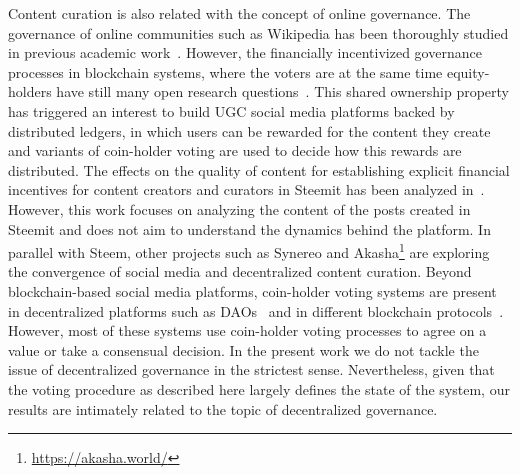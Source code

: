   Content curation is also related with the concept of online governance. The governance of online communities such as Wikipedia has been thoroughly studied in previous academic work~\cite{leskovec2010governance,forte2008scaling}. However, the financially incentivized governance processes in blockchain systems, where the voters are at the same time equity-holders have still many open research questions~\cite{vitalik,ehrsam}. This shared ownership property has triggered an interest to build UGC social media platforms backed by distributed ledgers, in which users can be rewarded for the content they create and variants of coin-holder voting are used to decide how this rewards are distributed. 
  The effects on the quality of content for establishing explicit financial incentives for content creators and curators in Steemit has been analyzed in~\cite{thelwall2017can}. However, this work focuses on analyzing the content of the posts created in Steemit and does not aim to understand the dynamics behind the platform. In parallel with Steem, other projects such as Synereo\cite{synereo} and Akasha\footnote{\url{https://akasha.world/}} are exploring the convergence of social media and decentralized content curation.
   Beyond blockchain-based social media platforms, coin-holder voting systems are present in decentralized platforms such as DAOs~\cite{darkdaos} and in different blockchain protocols~\cite{tezos}. However, most of these systems use coin-holder voting processes to agree on a value or take a consensual decision.
    In the present work we do not tackle the issue of decentralized governance in the strictest sense. Nevertheless, given that the voting procedure as described here largely defines the state of the system, our results are intimately related to the topic of decentralized governance.
    
    
